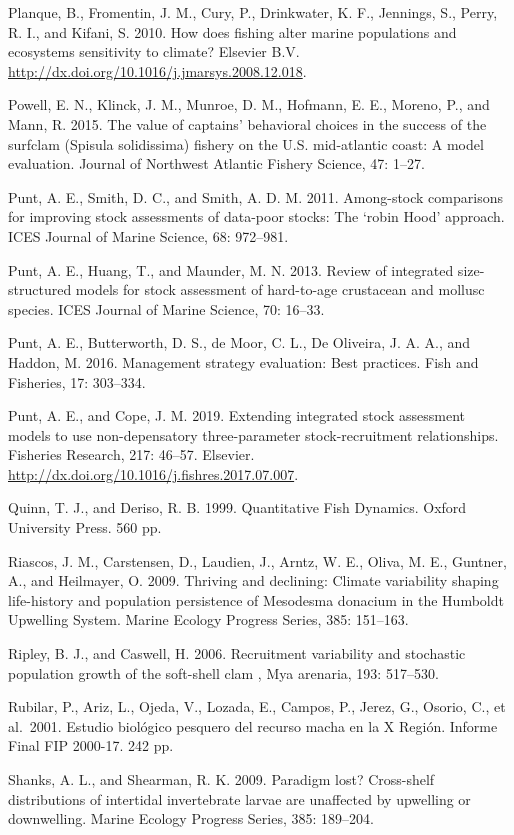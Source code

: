 \documentclass[12pt]{article}
\begin{document}
Planque, B., Fromentin, J. M., Cury, P., Drinkwater, K. F., Jennings,
S., Perry, R. I., and Kifani, S. 2010. How does fishing alter marine
populations and ecosystems sensitivity to climate? Elsevier B.V.
\url{http://dx.doi.org/10.1016/j.jmarsys.2008.12.018}.

Powell, E. N., Klinck, J. M., Munroe, D. M., Hofmann, E. E., Moreno, P.,
and Mann, R. 2015. The value of captains' behavioral choices in the
success of the surfclam (Spisula solidissima) fishery on the U.S.
mid-atlantic coast: A model evaluation. Journal of Northwest Atlantic
Fishery Science, 47: 1--27.

Punt, A. E., Smith, D. C., and Smith, A. D. M. 2011. Among-stock
comparisons for improving stock assessments of data-poor stocks: The
`robin Hood' approach. ICES Journal of Marine Science, 68: 972--981.

Punt, A. E., Huang, T., and Maunder, M. N. 2013. Review of integrated
size-structured models for stock assessment of hard-to-age crustacean
and mollusc species. ICES Journal of Marine Science, 70: 16--33.

Punt, A. E., Butterworth, D. S., de Moor, C. L., De Oliveira, J. A. A.,
and Haddon, M. 2016. Management strategy evaluation: Best practices.
Fish and Fisheries, 17: 303--334.

Punt, A. E., and Cope, J. M. 2019. Extending integrated stock assessment
models to use non-depensatory three-parameter stock-recruitment
relationships. Fisheries Research, 217: 46--57. Elsevier.
\url{http://dx.doi.org/10.1016/j.fishres.2017.07.007}.

Quinn, T. J., and Deriso, R. B. 1999. Quantitative Fish Dynamics. Oxford
University Press. 560 pp.

Riascos, J. M., Carstensen, D., Laudien, J., Arntz, W. E., Oliva, M. E.,
Guntner, A., and Heilmayer, O. 2009. Thriving and declining: Climate
variability shaping life-history and population persistence of Mesodesma
donacium in the Humboldt Upwelling System. Marine Ecology Progress
Series, 385: 151--163.

Ripley, B. J., and Caswell, H. 2006. Recruitment variability and
stochastic population growth of the soft-shell clam , Mya arenaria, 193:
517--530.

Rubilar, P., Ariz, L., Ojeda, V., Lozada, E., Campos, P., Jerez, G.,
Osorio, C., et al.~2001. Estudio biológico pesquero del recurso macha en
la X Región. Informe Final FIP 2000-17. 242 pp.

Shanks, A. L., and Shearman, R. K. 2009. Paradigm lost? Cross-shelf
distributions of intertidal invertebrate larvae are unaffected by
upwelling or downwelling. Marine Ecology Progress Series, 385: 189--204.
\end{document}
